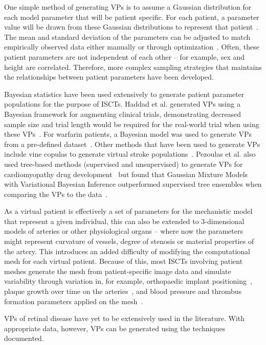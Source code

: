 \documentclass{article}
\begin{document}
One simple method of generating VPs is to assume a Gaussian distribution for each model parameter that will be patient specific. 
For each patient, a parameter value will be drawn from these Gaussian distributions to represent that patient~\cite{Gaffney2022, Jenner2021}. 
The mean and standard deviation of the parameters can be adjusted to match empirically observed data either manually or through optimization~\cite{Alfonso2020}. Often, these patient parameters are not independent of each other – for example, sex and height are correlated. Therefore, more complex sampling strategies that maintains the relationships between patient parameters have been developed.

Bayesian statistics have been used extensively to generate patient parameter populations for the purpose of ISCTs. Haddad et al. generated VPs using a Bayesian framework for augmenting clinical trials, demonstrating decreased sample size and trial length would be required for the real-world trial when using these VPs~\cite{Haddad2017a}. For warfarin patients, a Bayesian model was used to generate VPs from a pre-defined dataset~\cite{Fusaro2013}. Other methods that have been used to generate VPs include vine copulas to generate virtual stroke populations~\cite{Miller2021}. Pezoulas et al. also used tree-based methods (supervised and unsupervised) to generate VPs for cardiomyopathy drug development~\cite{Pezoulas2020} but found that Gaussian Mixture Models with Variational Bayesian Inference outperformed supervised tree ensembles when comparing the VPs to the data~\cite{Pezoulas2021}.

As a virtual patient is effectively a set of parameters for the mechanistic model that represent a given individual, this can also be extended to 3-dimensional models of arteries or other physiological organs – where now the parameters might represent curvature of vessels, degree of stenosis or material properties of the artery. 
This introduces an added difficulty of modifying the computational mesh for each virtual patient.
Because of this, most ISCTs involving patient meshes generate the mesh from patient-specific image data and simulate variability through variation in, for example, orthopaedic implant positioning~\cite{AlDirini2019}, plaque growth over time on the arteries~\cite{Pleouras2021}, and blood pressure and thrombus formation parameters applied on the mesh~\cite{SarramiForoushani2021}.

VPs of retinal disease have yet to be extensively used in the literature. With appropriate data, however, VPs can be generated using the techniques documented.
\end{document}
